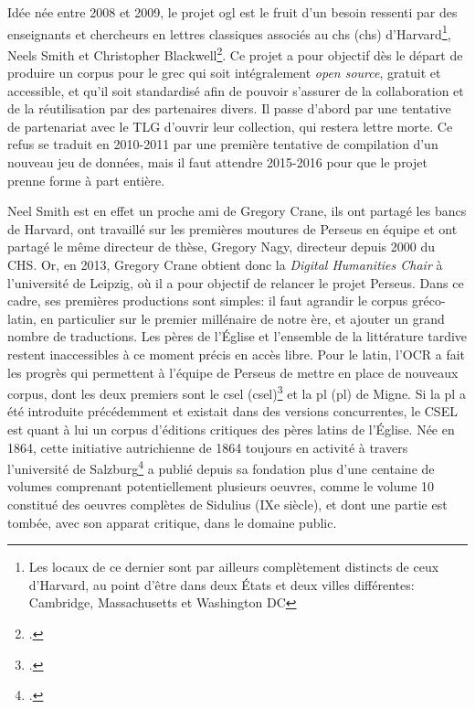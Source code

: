 Idée née entre 2008 et 2009, le projet \acrshort{ogl} est le fruit d'un besoin ressenti par des enseignants et chercheurs en lettres classiques associés au \acrfull{chs} (\acrshort{chs}) d'Harvard\footnote{Les locaux de ce dernier sont par ailleurs complètement distincts de ceux d'Harvard, au point d'être dans deux États et deux villes différentes: Cambridge, Massachusetts et Washington DC}, Neels Smith et Christopher Blackwell\footcite{muellner2019free}. Ce projet a pour objectif dès le départ de produire un corpus pour le grec qui soit intégralement \textit{open source}, gratuit et accessible, et qu'il soit standardisé afin de pouvoir s'assurer de la collaboration et de la réutilisation par des partenaires divers. Il passe d'abord par une tentative de partenariat avec le TLG d'ouvrir leur collection, qui restera lettre morte. Ce refus se traduit en 2010-2011 par une première tentative de compilation d'un nouveau jeu de données, mais il faut attendre 2015-2016 pour que le projet prenne forme à part entière.

Neel Smith est en effet un proche ami de Gregory Crane, ils ont partagé les bancs de Harvard, ont travaillé sur les premières moutures de Perseus en équipe et ont partagé le même directeur de thèse, Gregory Nagy, directeur depuis 2000 du CHS. Or, en 2013, Gregory Crane obtient donc la \textit{Digital Humanities Chair} à l'université de Leipzig, où il a pour objectif de relancer le projet Perseus. Dans ce cadre, ses premières productions sont simples: il faut agrandir le corpus gréco-latin, en particulier sur le premier millénaire de notre ère, et ajouter un grand nombre de traductions. Les pères de l'Église et l'ensemble de la littérature tardive restent inaccessibles à ce moment précis en accès libre. Pour le latin, l'OCR a fait les progrès qui permettent à l'équipe de Perseus de mettre en place de nouveaux corpus, dont les deux premiers sont le \acrfull{csel} (\acrshort{csel})\footcite{noauthor_csel_nodate} et la \acrfull{pl} (\acrshort{pl}) de Migne. Si la \acrshort{pl} a été introduite précédemment et existait dans des versions concurrentes, le CSEL est quant à lui un corpus d'éditions critiques des pères latins de l'Église. Née en 1864, cette initiative autrichienne de 1864 toujours en activité à travers l'université de Salzburg\footcite{noauthor_history_nodate} a publié depuis sa fondation plus d'une centaine de volumes comprenant potentiellement plusieurs oeuvres, comme le volume 10 constitué des oeuvres complètes de Sidulius (IXe siècle), et dont une partie est tombée, avec son apparat critique, dans le domaine public.

